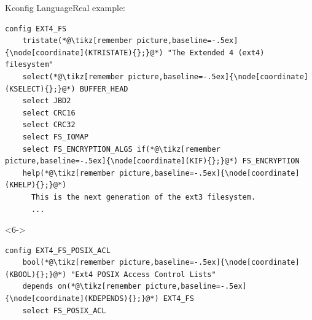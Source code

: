 \begin{frame}[fragile]{Kconfig Language}{Real example: }

  \begin{lstlisting}[language=Kconfig,basicstyle=\footnotesize\ttfamily]
config EXT4_FS
    tristate(*@\tikz[remember picture,baseline=-.5ex]{\node[coordinate](KTRISTATE){};}@*) "The Extended 4 (ext4) filesystem"
    select(*@\tikz[remember picture,baseline=-.5ex]{\node[coordinate](KSELECT){};}@*) BUFFER_HEAD
    select JBD2
    select CRC16
    select CRC32
    select FS_IOMAP
    select FS_ENCRYPTION_ALGS if(*@\tikz[remember picture,baseline=-.5ex]{\node[coordinate](KIF){};}@*) FS_ENCRYPTION
    help(*@\tikz[remember picture,baseline=-.5ex]{\node[coordinate](KHELP){};}@*)
      This is the next generation of the ext3 filesystem.
      ...
  \end{lstlisting}
  \begin{uncoverenv}<6->
    \begin{lstlisting}[language=Kconfig,basicstyle=\footnotesize\ttfamily]
config EXT4_FS_POSIX_ACL
    bool(*@\tikz[remember picture,baseline=-.5ex]{\node[coordinate](KBOOL){};}@*) "Ext4 POSIX Access Control Lists"
    depends on(*@\tikz[remember picture,baseline=-.5ex]{\node[coordinate](KDEPENDS){};}@*) EXT4_FS
    select FS_POSIX_ACL
    \end{lstlisting}
  \end{uncoverenv}

\end{frame}
